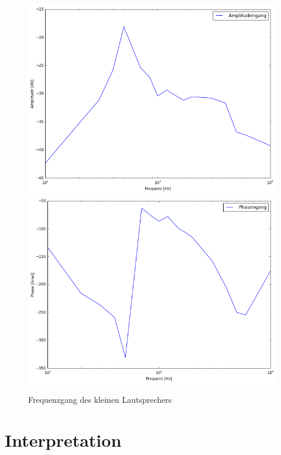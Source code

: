 \documentclass[12pt,oneside,a4paper]{report}
\begin{document}
\begin{figure}
\centering\small
\includegraphics[scale=0.6]{src/AmplitudenspektrumLautsprecher2.png}
\includegraphics[scale=0.6]{src/PhasenverschiebungLautsprecher2.png}
\caption{Frequenzgang des kleinen Lautsprechers}
\label{fig:LAUT_HOCH_FREQUENZGANG}
\end{figure}

\section{Interpretation}
\label{chap:VERSUCH_2_INTERPRETATION}
\end{document}
